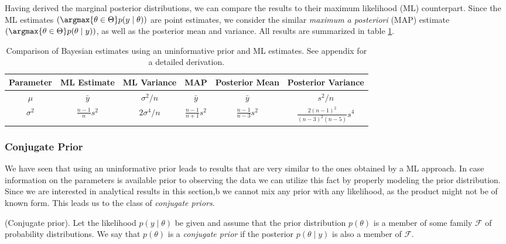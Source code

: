 Having derived the marginal posterior distributions, we can compare the results to their maximum likelihood (ML) counterpart.
Since the ML estimates $\left(\argmax{\theta \in \Theta}p(y \mid \theta)\right)$ are point estimates, we consider the similar \emph{maximum a posteriori} (MAP) estimate $\left(\argmax{\theta \in \Theta} p(\theta \mid y)\right)$, as well as the posterior mean and variance. All results are summarized in table \ref{table:comp_uniform_bay_ml}.

\begin{table}[ht]
\centering
\def\arraystretch{1.3}
{\small
 \begin{tabular}{c | c c c c c}
 Parameter & ML Estimate & ML Variance & MAP & Posterior Mean & Posterior Variance\\[0.5ex]
 \hline
 $\mu$ & $\bar{y}$ & $\sigma^2/n$ & $\bar{y}$ & $\bar{y}$ & $s^2 / n$\\
 $\sigma^2$ & $\frac{n-1}{n} s^2$ & $2 \sigma^4 /n$ & $\frac{n-1}{n+1} s^2$ & $\frac{n-1}{n-3} s^2$ & $\frac{2 (n-1)^2}{(n-3)^2 (n-5)} s^4$\\
 \end{tabular}
 }
\caption{\small {Comparison of Bayesian estimates using an uninformative prior and ML estimates. See appendix for a detailed derivation.}}
\label{table:comp_uniform_bay_ml}
\end{table}


\subsubsection*{Conjugate Prior}
We have seen that using an uninformative prior leads to results that are very similar to the ones obtained by a ML approach.
In case information on the parameters is available prior to observing the data we can utilize this fact by properly modeling the prior distribution.
Since we are interested in analytical results in this section,b we cannot mix any prior with any likelihood, as the product might not be of known form.
This leads us to the class of \emph{conjugate priors}.

\begin{definition}{(Conjugate prior).}
Let the likelihood $p(y \mid \theta)$ be given and assume that the prior distribution $p(\theta)$ is a member of some family $\mathcal{F}$ of probability distributions.
We say that $p(\theta)$ is a \emph{conjugate prior} if the posterior $p(\theta \mid y)$ is also a member of $\mathcal{F}$.
\end{definition}

